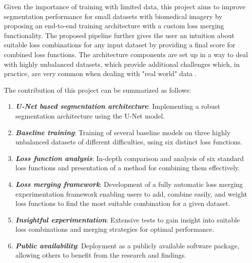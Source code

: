 Given the importance of training with limited data, this project aims to improve segmentation performance for small datasets with biomedical imagery by proposing an end-to-end training architecture with a custom loss merging functionality. The proposed pipeline further gives the user an intuition about suitable loss combinations for any input dataset by providing a final score for combined loss functions. The architecture components are set up in a way to deal with highly unbalanced datasets, which provide additional challenges which, in practice, are very common when dealing with "real world" data \cite{DBLP:journals/corr/abs-1901-08394} \cite{DBLP:journals/corr/abs-1710-05381}.

The contribution of this project can be summarized as follows:
\begin{enumerate}
  \item \textbf{\emph{U-Net based segmentation architecture}}: Implementing a robust segmentation architecture using the U-Net model.
  \item \textbf{\emph{Baseline training}}: Training of several baseline models on three highly unbalanced datasets of different difficulties, using six distinct loss functions.
  \item \textbf{\emph{Loss function analysis}}: In-depth comparison and analysis of six standard loss functions and presentation of a method for combining them effectively.
  \item \textbf{\emph{Loss merging framework}}: Development of a fully automatic loss merging experimentation framework enabling users to add, combine easily, and weight loss functions to find the most suitable combination for a given dataset.
  \item \textbf{\emph{Insightful experimentation}}: Extensive tests to gain insight into suitable loss combinations and merging strategies for optimal performance.
  \item \textbf{\emph{Public availability}}: Deployment as a publicly available software package, allowing others to benefit from the research and findings.
\end{enumerate}

